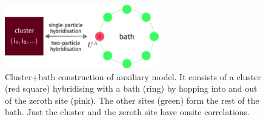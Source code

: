 \documentclass{report}
\numberwithin{equation}{section}
\begin{document}
 \begin{figure}[htpb]
 	\centering
 	\includegraphics[width=0.6\textwidth]{../figures/gen_siam.pdf}
 	\caption{Cluster+bath construction of auxiliary model. It consists of a cluster (red square) hybridising with a bath (ring) by hopping into and out of the zeroth site (pink). The other sites (green) form the rest of the bath. Just the cluster and the zeroth site have onsite correlations.}
 \end{figure}
\end{document}
